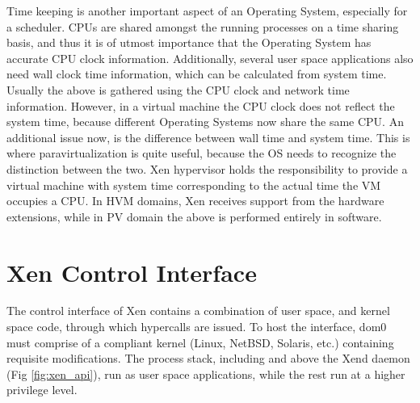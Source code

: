 Time keeping is another important aspect of an Operating System, especially for a scheduler. CPUs are shared amongst the running processes on a time sharing basis, and thus it is of utmost importance that the Operating System has accurate CPU clock information. Additionally, several user space applications also need wall clock time information, which can be calculated from system time. Usually the above is gathered using the CPU clock and network time information. However, in a virtual machine the CPU clock does not reflect the system time, because different Operating Systems now share the same CPU. An additional issue now, is the difference between wall time and system time. This is where paravirtualization is quite useful, because the OS needs to recognize the distinction between the two. Xen hypervisor holds the responsibility to provide a virtual machine with system time corresponding to the actual time the VM occupies a CPU. In HVM domains, Xen receives support from the hardware extensions, while in PV domain the above is performed entirely in software. 

\section{Xen Control Interface}
The control interface of Xen contains a combination of user space, and kernel space code, through which hypercalls are issued. To host the interface, dom0 must comprise of a compliant kernel (Linux, NetBSD, Solaris, etc.) containing requisite modifications. The process stack, including and above the Xend daemon (Fig \ref{fig:xen_api}), run as user space applications, while the rest run at a higher privilege level. 

